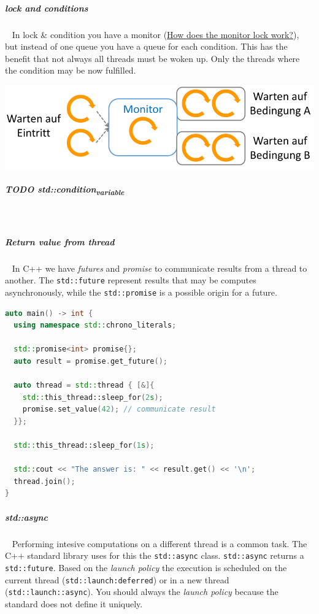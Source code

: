 \documentclass[11pt,twoside,landscape]{article}
\begin{document}
\begin{multicols}{2}
\subparagraph{lock and conditions} \
\label{sec:orge7183e0}
In lock \& condition you have a monitor (\href{../../../roam/20220315074811-how_does_the_monitor_lock_work.org}{How does the monitor lock work?}), but instead of one queue you have a queue for each condition.
This has the benefit that not always all threads must be woken up.
Only the threads where the condition may be now fulfilled.


{
\begin{center}
\includegraphics[width=.9\linewidth]{img/lock_and_conditions.png}
\end{center}
\label{fig:lock-and-conditions}
}
\subparagraph{{\bfseries\sffamily TODO} std::condition\textsubscript{variable}} \
\label{sec:org8d72175}
\subparagraph{Return value from thread} \
\label{sec:orgd25eaf4}
In C++ we have \emph{futures} and \emph{promise} to communicate results from a thread to another.
The \texttt{std::future} represent results that may be computes asynchronously, while the \texttt{std::promise} is a possible origin for a future.

\begin{lstlisting}[language=c++,label=lst:example-usage-for-future-and-promise,caption={Example usage for future and promise},captionpos=b,numbers=none]
auto main() -> int {
  using namespace std::chrono_literals;

  std::promise<int> promise{};
  auto result = promise.get_future();

  auto thread = std::thread { [&]{
    std::this_thread::sleep_for(2s);
    promise.set_value(42); // communicate result
  }};

  std::this_thread::sleep_for(1s);

  std::cout << "The answer is: " << result.get() << '\n';
  thread.join();
}
\end{lstlisting}

\subparagraph{std::async} \
\label{sec:orga4abb92}
Performing intesive computations on a different thread is a common task.
The C++ standard library uses for this the \texttt{std::async} class.
\texttt{std::async} returns a \texttt{std::future}.
Based on the \emph{launch policy} the execution is scheduled on the current thread (\texttt{std::launch:deferred}) or in a new thread (\texttt{std::launch::async}).
You should always the \emph{launch policy} because the standard does not define it uniquely. 


\end{multicols}
\end{document}

